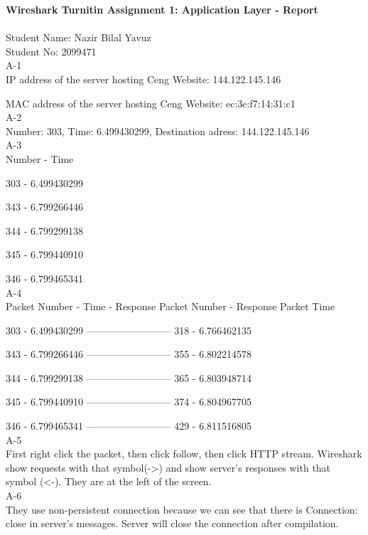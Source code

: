 \documentclass[12pt]{article}
\begin{document}
\textbf{Wireshark Turnitin Assignment 1: Application Layer - Report} \\\\
Student Name: Nazir Bilal Yavuz\\
Student No: 2099471\\

A-1\\

IP address of the server hosting Ceng Website: 144.122.145.146

MAC address of the server hosting Ceng Website: ec:3e:f7:14:31:c1\\

A-2\\

Number: 303, Time: 6.499430299, Destination adress: 144.122.145.146\\

A-3\\

Number - Time

303 - 6.499430299

343 - 6.799266446

344 - 6.799299138

345 - 6.799440910

346 - 6.799465341\\

A-4\\

Packet Number - Time - Response Packet Number - Response Packet Time

303 - 6.499430299 -------------------------- 318 - 6.766462135

343 - 6.799266446 -------------------------- 355 - 6.802214578

344 - 6.799299138 -------------------------- 365 - 6.803948714

345 - 6.799440910 -------------------------- 374 - 6.804967705

346 - 6.799465341 -------------------------- 429 - 6.811516805\\

A-5\\

First right click the packet, then click follow, then click HTTP stream. Wireshark show requests with that symbol(->) and show server's responses with that symbol (<-). They are at the left of the screen.\\

A-6\\

They use non-persistent connection because we can see that there is Connection: close in server's messages. Server will close the connection after compilation.
\end{document}
